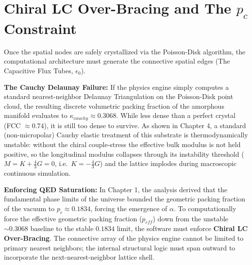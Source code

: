 \section{Chiral LC Over-Bracing and The $p_c$ Constraint}
Once the spatial nodes are safely crystallized via the Poisson-Disk algorithm, the computational architecture must generate the connective spatial edges (The Capacitive Flux Tubes, $\epsilon_0$).

\textbf{The Cauchy Delaunay Failure:} If the physics engine simply computes a standard nearest-neighbor Delaunay Triangulation on the Poisson-Disk point cloud, the resulting discrete volumetric packing fraction of the amorphous manifold evaluates to $\kappa_{cauchy} \approx 0.3068$. While less dense than a perfect crystal (FCC $\approx 0.74$), it is still too dense to survive. As shown in Chapter 4, a standard (non-micropolar) Cauchy elastic treatment of this substrate is thermodynamically unstable: without the chiral couple-stress the effective bulk modulus is not held positive, so the longitudinal modulus collapses through its instability threshold ($M = K + \frac{4}{3}G = 0$, i.e.\ $K = -\frac{4}{3}G$) and the lattice implodes during macroscopic continuous simulation.

\textbf{Enforcing QED Saturation:} In Chapter 1, the analysis derived that the fundamental phase limits of the universe bounded the geometric packing fraction of the vacuum to $p_{c} \approx \mathbf{0.1834}$, forcing the emergence of $\alpha$. To computationally force the effective geometric packing fraction ($p_{eff}$) down from the unstable $\sim 0.3068$ baseline to the stable $0.1834$ limit, the software must enforce \textbf{Chiral LC Over-Bracing}. The connective array of the physics engine cannot be limited to primary nearest neighbors; the internal structural logic must span outward to incorporate the next-nearest-neighbor lattice shell.

